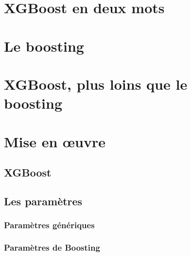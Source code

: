 \documentclass[11pt,a4paper]{article}
\begin{document}
%
%


%
%

\setcounter{page}{1}
\renewcommand*{\thepage}{\Roman{page}}

  

%
%

\renewcommand*{\thepage}{\arabic{page}}

%
%

\section{XGBoost en deux mots}\marginpar{\tableOfContents}


\section{Le boosting}






\section{XGBoost, plus loins que le boosting}



\section{Mise en \oe uvre}
\subsection{XGBoost}
\subsection{Les paramètres}
\subsubsection{Paramètres génériques}
\subsubsection{Paramètres de Boosting}
\end{document}
